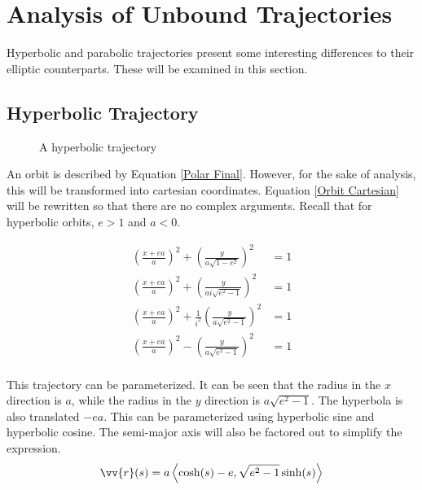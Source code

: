 \documentclass{article}
\begin{document}
\pagebreak
\section{Analysis of Unbound Trajectories}\label{Special Trajectories}

Hyperbolic and parabolic trajectories present some interesting differences to their elliptic counterparts. These will be examined in this section.

\subsection{Hyperbolic Trajectory}\label{sec:Hyperbolic Orbits}

\begin{figure}[H]
    \centering
    \caption{A hyperbolic trajectory}\label{fig:Hyperbolic Trajectory}
\end{figure}

An orbit is described by Equation \eqref{Polar Final}. However, for the sake of analysis, this will be transformed into cartesian coordinates. Equation \eqref{Orbit Cartesian} will be rewritten so that there are no complex arguments. Recall that for hyperbolic orbits, $e>1$ and $a<0$.

\begin{align*}
    \left(\frac{x+ea}{a}\right)^2+\left(\frac{y}{a\sqrt{1-e^2}}\right)^2              & =1 \\
    \left(\frac{x+ea}{a}\right)^2+\left(\frac{y}{ai\sqrt{e^2-1}}\right)^2             & =1 \\
    \left(\frac{x+ea}{a}\right)^2+\frac{1}{i^2}\left(\frac{y}{a\sqrt{e^2-1}}\right)^2 & =1 \\
    \left(\frac{x+ea}{a}\right)^2-\left(\frac{y}{a\sqrt{e^2-1}}\right)^2              & =1 \\
\end{align*}

This trajectory can be parameterized. It can be seen that the radius in the $x$ direction is $a$, while the radius in the $y$ direction is $a\sqrt{e^2-1}$. The hyperbola is also translated $-ea$. This can be parameterized using hyperbolic sine and hyperbolic cosine. The semi-major axis will also be factored out to simplify the expression.
\begin{equation}\label{Hyperbola Parametric}
    \vv{r}(s)=a\left\langle\cosh(s)-e, \sqrt{e^2-1}\sinh(s)\right\rangle
\end{equation}
\end{document}
